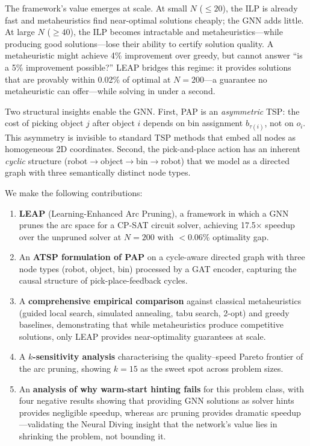 \documentclass[conference]{IEEEtran}
\begin{document}
The framework's value emerges at scale. At small $N$ (${\le}20$), the ILP is already fast and metaheuristics find near-optimal solutions cheaply; the GNN adds little. At large $N$ (${\ge}40$), the ILP becomes intractable and metaheuristics---while producing good solutions---lose their ability to certify solution quality. A metaheuristic might achieve 4\% improvement over greedy, but cannot answer ``is a 5\% improvement possible?'' LEAP bridges this regime: it provides solutions that are provably within 0.02\% of optimal at $N{=}200$---a guarantee no metaheuristic can offer---while solving in under a second.

Two structural insights enable the GNN. First, PAP is an \emph{asymmetric} TSP: the cost of picking object $j$ after object $i$ depends on bin assignment $b_{\tau(i)}$, not on $o_i$. This asymmetry is invisible to standard TSP methods that embed all nodes as homogeneous 2D coordinates. Second, the pick-and-place action has an inherent \emph{cyclic} structure (robot$\to$object$\to$bin$\to$robot) that we model as a directed graph with three semantically distinct node types.

We make the following contributions:
\begin{enumerate}
    \item \textbf{LEAP} (Learning-Enhanced Arc Pruning), a framework in which a GNN prunes the arc space for a CP-SAT circuit solver, achieving 17.5$\times$ speedup over the unpruned solver at $N{=}200$ with $<$0.06\% optimality gap.
    \item An \textbf{ATSP formulation of PAP} on a cycle-aware directed graph with three node types (robot, object, bin) processed by a GAT encoder, capturing the causal structure of pick-place-feedback cycles.
    \item A \textbf{comprehensive empirical comparison} against classical metaheuristics (guided local search, simulated annealing, tabu search, 2-opt) and greedy baselines, demonstrating that while metaheuristics produce competitive solutions, only LEAP provides near-optimality guarantees at scale.
    \item A \textbf{$k$-sensitivity analysis} characterising the quality--speed Pareto frontier of the arc pruning, showing $k{=}15$ as the sweet spot across problem sizes.
    \item An \textbf{analysis of why warm-start hinting fails} for this problem class, with four negative results showing that providing GNN solutions as solver hints provides negligible speedup, whereas arc pruning provides dramatic speedup---validating the Neural Diving insight \cite{nair2021neural} that the network's value lies in shrinking the problem, not bounding it.
\end{enumerate}
\end{document}
